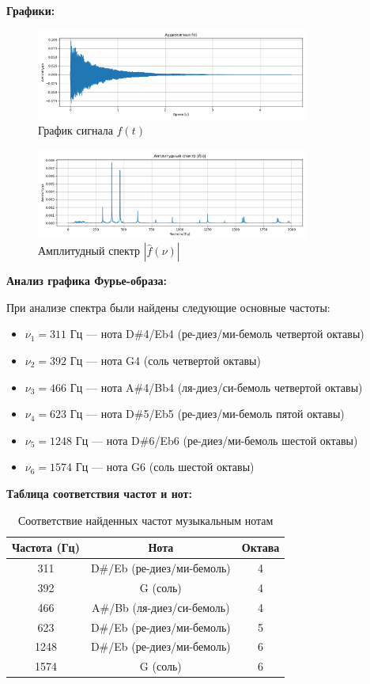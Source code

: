 \textbf{Графики:}

\begin{figure}[H]
    \centering
    \includegraphics[width=0.8\textwidth]{audio_signal.png}
    \caption{График сигнала $f(t)$}
\end{figure}

\begin{figure}[H]
    \centering
    \includegraphics[width=0.8\textwidth]{audio_spectrum.png}
    \caption{Амплитудный спектр $|\hat{f}(\nu)|$}
\end{figure}

\textbf{Анализ графика Фурье-образа:}

При анализе спектра были найдены следующие основные частоты:

\begin{itemize}
    \item $\nu_1 = 311$ Гц — нота D\#4/Eb4 (ре-диез/ми-бемоль четвертой октавы)
    \item $\nu_2 = 392$ Гц — нота G4 (соль четвертой октавы)
    \item $\nu_3 = 466$ Гц — нота A\#4/Bb4 (ля-диез/си-бемоль четвертой октавы)
    \item $\nu_4 = 623$ Гц — нота D\#5/Eb5 (ре-диез/ми-бемоль пятой октавы)
    \item $\nu_5 = 1248$ Гц — нота D\#6/Eb6 (ре-диез/ми-бемоль шестой октавы)
    \item $\nu_6 = 1574$ Гц — нота G6 (соль шестой октавы)
\end{itemize}

\textbf{Таблица соответствия частот и нот:}

\begin{table}[H]
\centering
\begin{tabular}{|c|c|c|}
\hline
\textbf{Частота (Гц)} & \textbf{Нота} & \textbf{Октава} \\
\hline
311 & D\#/Eb (ре-диез/ми-бемоль) & 4 \\
392 & G (соль) & 4 \\
466 & A\#/Bb (ля-диез/си-бемоль) & 4 \\
623 & D\#/Eb (ре-диез/ми-бемоль) & 5 \\
1248 & D\#/Eb (ре-диез/ми-бемоль) & 6 \\
1574 & G (соль) & 6 \\
\hline
\end{tabular}
\caption{Соответствие найденных частот музыкальным нотам}
\end{table}

